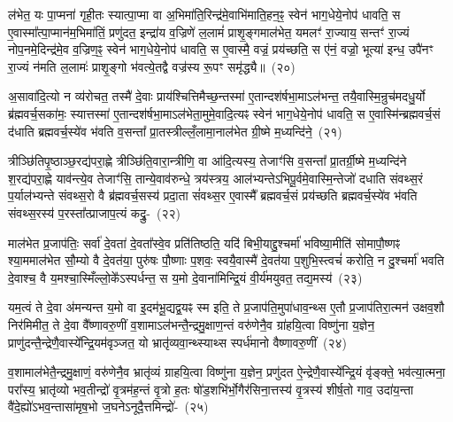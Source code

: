 \-ल॑भेत॒ यः पा॒प्मना॑ गृही॒तः स्यात्पा॒प्मा वा अ॒भि\-मा॑ति॒रिन्द्र॑\-मे॒वा\-भि॑मा\-ति॒हन॒ꣴ॒ स्वेन॑ भाग॒\-धेये॒नोप॑ धावति॒ स ए॒वास्मा᳚त्पा॒प्मान॑म॒भिमा॑तिं॒ प्रणु॑दत॒ इन्द्रा॑य व॒ज्रिणे॑ ल॒लामं॑ प्राशृ॒ङ्गमा\-ल॑भेत॒ यमलꣳ॑ रा॒ज्याय॒ सन्तꣳ॑ रा॒ज्यं नोप॒नमे॒दिन्द्र॑मे॒व व॒ज्रिण॒ꣴ॒ स्वेन॑ भाग॒\-धेये॒नोप॑ धावति॒ स ए॒वास्मै॒ वज्रं॒ प्रय॑च्छति॒ स ए॑नं॒ वज्रो॒ भूत्या॑ इन्ध॒ उपै॑नꣳ रा॒ज्यं न॑मति ल॒लामः॑ प्राशृ॒ङ्गो भ॑वत्ये॒तद्वै वज्र॑स्य रू॒पꣳ समृ॑द्ध्यै॥~(२०)\ip

{\anuvakamend[{स॒ङ्ग्रा॒मे तेनाल॑मभिमाति॒घ्ने ल॒लामं॑ प्राशृ॒ङ्गमैनं॒ पञ्च॑दश च।}]}

अ॒सावा॑दि॒त्यो न व्य॑रोचत॒ तस्मै॑ दे॒वाः प्राय॑श्चित्ति\-मैच्छ॒न्तस्मा॑ ए॒तान्दश॑र्\mbox{}षभा॒मा\-ऽल॑भन्त॒ तयै॒वास्मि॒न्रुच॑मदधु॒र्यो ब्र॑ह्मवर्च॒सका॑मः॒ स्यात्तस्मा॑ ए॒तान्दश॑र्\mbox{}षभा॒मा\-ऽल॑भेता॒मुमे॒वा\-दि॒त्यꣴ स्वेन॑ भाग॒\-धेये॒नोप॑ धावति॒ स ए॒वास्मि॑न्ब्रह्म\-वर्च॒सं द॑धाति ब्रह्मवर्च॒स्ये॑व भ॑वति व॒सन्ता᳚ प्रा॒तस्त्रील्लँ॒लामा॒ना\-ल॑भेत ग्री॒ष्मे म॒ध्यन्दि॑ने॒~(२१)\ip

त्रीञ्छि॑तिपृ॒ष्ठाञ्छ॒रद्य॑परा॒ह्णे त्रीञ्छि॑ति॒वारा॒न्त्रीणि॒ वा आ॑दि॒त्यस्य॒ तेजाꣳ॑सि व॒सन्ता᳚ प्रा॒तर्ग्री॒ष्मे म॒ध्यन्दि॑ने श॒रद्य॑परा॒ह्णे याव॑न्त्ये॒व तेजाꣳ॑सि॒ तान्ये॒वाव॑\-रुन्धे॒ त्रय॑स्त्रय॒ आल॑भ्यन्ते\-ऽभिपू॒र्वमे॒वास्मि॒न्तेजो॑ दधाति संवथ्स॒रं प॒र्याल॑भ्यन्ते संवथ्स॒रो वै ब्र॑ह्मवर्च॒सस्य॑ प्रदा॒ता सं॑वथ्स॒र ए॒वास्मै᳚ ब्रह्मवर्च॒सं प्रय॑च्छति ब्रह्मवर्च॒स्ये॑व भ॑वति संवथ्स॒रस्य॑ प॒रस्ता᳚त्प्राजाप॒त्यं कद्रु॒-~(२२)\ip

माल॑भेत प्र॒जा\-प॑तिः॒ सर्वा॑ दे॒वता॑ दे॒वता᳚स्वे॒व प्रति॑तिष्ठति॒ यदि॑ बिभी॒याद्दु॒श्चर्मा॑ भविष्या॒मीति॑ सोमापौ॒ष्णꣴ श्या॒ममाल॑भेत सौ॒म्यो वै दे॒वत॑या॒ पुरु॑षः पौ॒ष्णाः प॒शवः॒ स्वयै॒वास्मै॑ दे॒वत॑या प॒शुभि॒स्त्वचं॑ करोति॒ न दु॒श्चर्मा॑ भवति दे॒वाश्च॒ वै य॒मश्चा॒स्मिँल्लो॒के᳚\-ऽस्पर्धन्त॒ स य॒मो दे॒वाना॑मिन्द्रि॒यं वी॒र्य॑मयुवत॒ तद्य॒मस्य॑~(२३)\ip

यम॒त्वं ते दे॒वा अ॑मन्यन्त य॒मो वा इ॒दम॑भू॒द्यद्व॒यꣴ स्म इति॒ ते प्र॒जा\-प॑ति॒मुपा॑धाव॒न्थ्स ए॒तौ प्र॒जा\-प॑तिरा॒त्मन॑ उक्षव॒शौ निर॑मिमीत॒ ते दे॒वा वै᳚ष्णावरु॒णीं व॒शामा\-ऽल॑भन्तै॒न्द्रमु॒क्षाण॒न्तं वरु॑णेनै॒व ग्रा॑हयि॒त्वा विष्णु॑ना य॒ज्ञेन॒ प्राणु॑दन्तै॒न्द्रेणै॒वास्ये᳚न्द्रि॒यम॑वृञ्जत॒ यो भ्रातृ॑व्यवा॒न्थ्स्याथ्स स्पर्ध॑मानो वैष्णावरु॒णीं~(२४)\ip

व॒शामाल॑भेतै॒न्द्रमु॒क्षाणं॒ वरु॑णेनै॒व भ्रातृ॑व्यं ग्राहयि॒त्वा विष्णु॑ना य॒ज्ञेन॒ प्रणु॑दत ऐ॒न्द्रेणै॒वास्ये᳚न्द्रि॒यं वृ॑ङ्क्ते॒ भव॑त्या॒त्मना॒ परा᳚स्य॒ भ्रातृ॑व्यो भव॒तीन्द्रो॑ वृ॒त्रम॑ह॒न्तं वृ॒त्रो ह॒तः षो॑ड॒शभि॑र्भो॒गैर॑सिना॒त्तस्य॑ वृ॒त्रस्य॑ शीर्\mbox{}ष॒तो गाव॒ उदा॑य॒न्ता वै॑दे॒ह्यो॑\-ऽभव॒न्तासा॑मृष॒भो ज॒घने\-ऽनूदै॒त्तमिन्द्रो॑-~(२५)\ip

